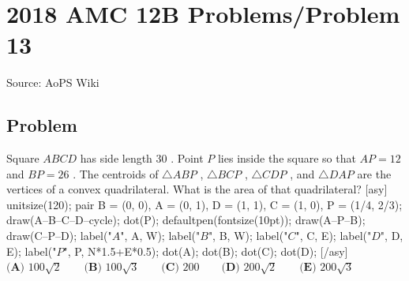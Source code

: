 \documentclass[12pt]{article}
\begin{document}
\section*{{2018 AMC 12B Problems/Problem 13}}
Source: AoPS Wiki

\subsection*{Problem}
Square $ABCD$ has side length $30$ . Point $P$ lies inside the square so that $AP = 12$ and $BP = 26$ . The centroids of $\triangle{ABP}$ , $\triangle{BCP}$ , $\triangle{CDP}$ , and $\triangle{DAP}$ are the vertices of a convex quadrilateral. What is the area of that quadrilateral? [asy] unitsize(120); pair B = (0, 0), A = (0, 1), D = (1, 1), C = (1, 0), P = (1/4, 2/3); draw(A--B--C--D--cycle); dot(P); defaultpen(fontsize(10pt)); draw(A--P--B); draw(C--P--D); label("$A$", A, W); label("$B$", B, W); label("$C$", C, E); label("$D$", D, E); label("$P$", P, N*1.5+E*0.5); dot(A); dot(B); dot(C); dot(D); [/asy] $\textbf{(A) }100\sqrt{2}\qquad\textbf{(B) }100\sqrt{3}\qquad\textbf{(C) }200\qquad\textbf{(D) }200\sqrt{2}\qquad\textbf{(E) }200\sqrt{3}$
\end{document}
